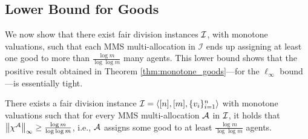 
\subsection{Lower Bound for Goods}

We now show that there exist fair division instances $\mathcal{I}$, with monotone valuations, such that each MMS multi-allocation in $\mathcal{I}$ ends up assigning at least one good to more than $\frac{\log m}{\log \log m}$ many agents. This lower bound shows that the positive result obtained in Theorem \ref{thm:monotone_goods}---for the $\ell_\infty$ bound---is essentially tight. 

\begin{theorem}
\label{thm:goods_lowerbound}
    There exists a fair division instance $\mathcal{I} = \langle [n], [m], \{v_i\}_{i=1}^n \rangle$ with monotone valuations such that for every MMS multi-allocation $\mathcal{A}$ in $\mathcal{I}$, it holds that $\left\|\chi^{\mathcal{A}}\right\|_\infty \geq \frac{\log m}{\log \log m}$, i.e., $\mathcal{A}$ assigns some good to at least $\frac{\log m}{\log\log m}$ agents.
\end{theorem}


